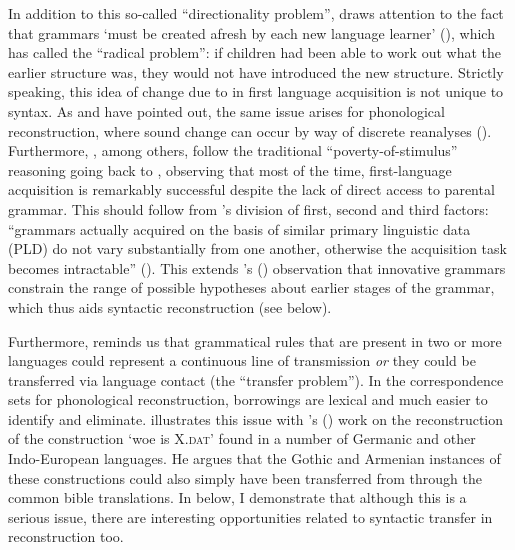 \documentclass[output=paper,colorlinks,citecolor=brown]{langscibook}
\begin{document}
In addition to this so-called “directionality problem”, \citet{mm:lightfoot1980reconstructing}  draws attention to the fact that grammars `must be created afresh by each new language learner' (\cite[37]{mm:lightfoot1980reconstructing}), which \citet[4]{mm:willis_reconstructing_2011} has called the “radical  problem”: if children had been able to work out what the earlier structure was, they would not have introduced the new structure. Strictly speaking, this idea of change due to  in first language acquisition is not unique to syntax. As \citet[372]{mm:harris_historical_1995} and \citet[23]{mm:walkden_comparative_2009} have pointed out, the same issue arises for phonological reconstruction, where sound change can occur by way of discrete reanalyses (\cite{mm:ohala_listener_1981}). Furthermore, \citet{mm:roberts_syntactic_2003}, among others, follow the traditional “poverty\hyp of\hyp stimulus” reasoning going back to \citet{mm:chomsky_binding_1980}, observing that most of the time, first-language acquisition is remarkably successful despite the lack of direct access to parental grammar. This should follow from \citet{mm:chomsky_three_2005}'s division of first, second and third factors: ``grammars actually acquired on the basis of similar primary linguistic data (PLD) do not vary substantially from one another, otherwise the acquisition task becomes intractable'' (\cite[49]{mm:Walkden2014}). This extends \citeauthor{mm:willis_reconstructing_2011}'s (\citeyear[2]{mm:willis_reconstructing_2011}) observation that innovative grammars constrain the range of possible hypotheses about earlier stages of the grammar, which thus aids syntactic reconstruction (see  below).

Furthermore, \citet{mm:willis_reconstructing_2011} reminds us that grammatical rules that are present in two or more languages could represent a continuous line of transmission \textit{or} they could be transferred via language contact (the “transfer problem”). In the correspondence sets for phonological reconstruction, borrowings are lexical and much easier to identify and eliminate. \citet{mm:clackson2017} illustrates this issue with \citeauthor{mm:bardal_syntax_2013}'s (\citeyear{mm:bardal_syntax_2013}) work on the reconstruction of the construction `woe is X.\textsc{dat}' found in a number of Germanic and other Indo-European languages. He argues that the Gothic and Armenian instances of these constructions could also simply have been transferred from  through the common bible translations. In  below, I demonstrate that although this is a serious issue, there are interesting opportunities related to syntactic transfer in reconstruction too.
\end{document}
